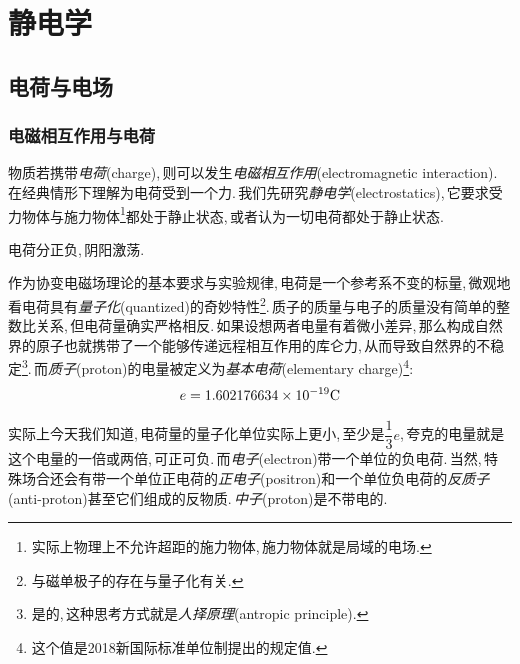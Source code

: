 \chapter{静电学}


\section{电荷与电场}

\subsection{电磁相互作用与电荷}
物质若携带\emph{电荷}(charge),\,则可以发生\emph{电磁相互作用}(electromagnetic interaction).\,在经典情形下理解为电荷受到一个力.\,我们先研究\emph{静电学}(electrostatics),\,它要求受力物体与施力物体\footnote{实际上物理上不允许超距的施力物体,\,施力物体就是局域的电场.}都处于静止状态,\,或者认为一切电荷都处于静止状态.

电荷分正负,\,阴阳激荡.

作为协变电磁场理论的基本要求与实验规律,\,电荷是一个参考系不变的标量,\,微观地看电荷具有\emph{量子化}(quantized)的奇妙特性\footnote{与磁单极子的存在与量子化有关.}.\,质子的质量与电子的质量没有简单的整数比关系,\,但电荷量确实严格相反.\,如果设想两者电量有着微小差异,\,那么构成自然界的原子也就携带了一个能够传递远程相互作用的库仑力,\,从而导致自然界的不稳定\footnote{是的,\,这种思考方式就是\emph{人择原理}(antropic principle).}.\,而\emph{质子}(proton)的电量被定义为\emph{基本电荷}(elementary charge)\footnote{这个值是2018新国际标准单位制提出的规定值.}:
\[e=1.602176634\times 10^{-19} {\rm C}\]

实际上今天我们知道,\,电荷量的量子化单位实际上更小,\,至少是\(\dfrac{1}{3}e\),\,夸克的电量就是这个电量的一倍或两倍,\,可正可负.\,而\emph{电子}(electron)带一个单位的负电荷.\,当然,\,特殊场合还会有带一个单位正电荷的\emph{正电子}(positron)和一个单位负电荷的\emph{反质子}(anti-proton)甚至它们组成的反物质.\,\emph{中子}(proton)是不带电的.


